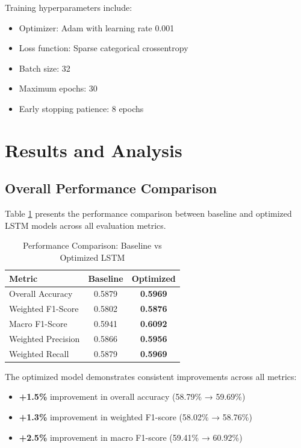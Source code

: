 \documentclass[a4paper,11pt]{article}
\begin{document}
Training hyperparameters include:
\begin{itemize}
\item Optimizer: Adam with learning rate 0.001
\item Loss function: Sparse categorical crossentropy
\item Batch size: 32
\item Maximum epochs: 30
\item Early stopping patience: 8 epochs
\end{itemize}

\section{Results and Analysis}

\subsection{Overall Performance Comparison}

Table \ref{tab:performance_comparison} presents the performance comparison between baseline and optimized LSTM models across all evaluation metrics.

\begin{table}[H]
\centering
\caption{Performance Comparison: Baseline vs Optimized LSTM}
\label{tab:performance_comparison}
\begin{tabular}{lcc}
\toprule
\textbf{Metric} & \textbf{Baseline} & \textbf{Optimized} \\
\midrule
Overall Accuracy & 0.5879 & \textcolor{improvement}{\textbf{0.5969}} \\
Weighted F1-Score & 0.5802 & \textcolor{improvement}{\textbf{0.5876}} \\
Macro F1-Score & 0.5941 & \textcolor{improvement}{\textbf{0.6092}} \\
Weighted Precision & 0.5866 & \textcolor{improvement}{\textbf{0.5956}} \\
Weighted Recall & 0.5879 & \textcolor{improvement}{\textbf{0.5969}} \\
\bottomrule
\end{tabular}
\end{table}

The optimized model demonstrates consistent improvements across all metrics:
\begin{itemize}
\item \textcolor{improvement}{\textbf{+1.5\%}} improvement in overall accuracy (58.79\% → 59.69\%)
\item \textcolor{improvement}{\textbf{+1.3\%}} improvement in weighted F1-score (58.02\% → 58.76\%)
\item \textcolor{improvement}{\textbf{+2.5\%}} improvement in macro F1-score (59.41\% → 60.92\%)
\end{itemize}
\end{document}
